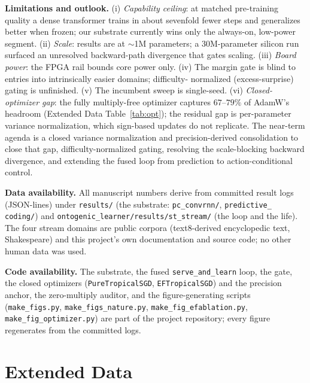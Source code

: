 \documentclass[11pt]{article}
\newcommand{\heading}[1]{\vspace{4pt}\noindent\textbf{#1}\hspace{0.6em}}
\begin{document}
\heading{Limitations and outlook.}
(i) \emph{Capability ceiling}: at matched pre-training quality a dense
transformer trains in about sevenfold fewer steps and generalizes better when
frozen; our substrate currently wins only the always-on, low-power segment.
(ii) \emph{Scale}: results are at $\sim$1M parameters; a 30M-parameter silicon
run surfaced an unresolved backward-path divergence that gates scaling.
(iii) \emph{Board power}: the FPGA rail bounds core power only. (iv) The margin
gate is blind to entries into intrinsically easier domains; difficulty-%
normalized (excess-surprise) gating is unfinished. (v) The incumbent sweep is
single-seed. (vi) \emph{Closed-optimizer gap}: the fully multiply-free optimizer
captures $67$--$79\%$ of AdamW's headroom (Extended Data Table~\ref{tab:opt}); the
residual gap is per-parameter variance normalization, which sign-based updates do
not replicate. The near-term agenda is a closed variance normalization and
precision-derived consolidation to close that gap, difficulty-normalized gating,
resolving the scale-blocking backward divergence, and extending the fused loop from
prediction to action-conditional control.

\heading{Data availability.}
All manuscript numbers derive from committed result logs (JSON-lines) under
\texttt{results/} (the substrate: \texttt{pc\_convrnn/}, \texttt{predictive\_%
coding/}) and \texttt{ontogenic\_learner/results/st\_stream/} (the loop and the
life). The four stream domains are public corpora (text8-derived encyclopedic
text, Shakespeare) and this project's own documentation and source code; no
other human data was used.

\heading{Code availability.}
The substrate, the fused \texttt{serve\_and\_learn} loop, the gate, the
closed optimizers (\texttt{PureTropicalSGD}, \texttt{EFTropicalSGD}) and the
precision anchor, the zero-multiply auditor, and the figure-generating scripts
(\texttt{make\_figs.py}, \texttt{make\_figs\_nature.py},
\texttt{make\_fig\_efablation.py}, \texttt{make\_fig\_optimizer.py}) are part of
the project repository; every figure regenerates from the committed logs.

\clearpage
\section*{Extended Data}
\small
\setcounter{figure}{0}
\setcounter{table}{0}
\captionsetup[figure]{name=Extended Data Fig.}
\captionsetup[table]{name=Extended Data Table}
\vspace{6pt}
\end{document}
